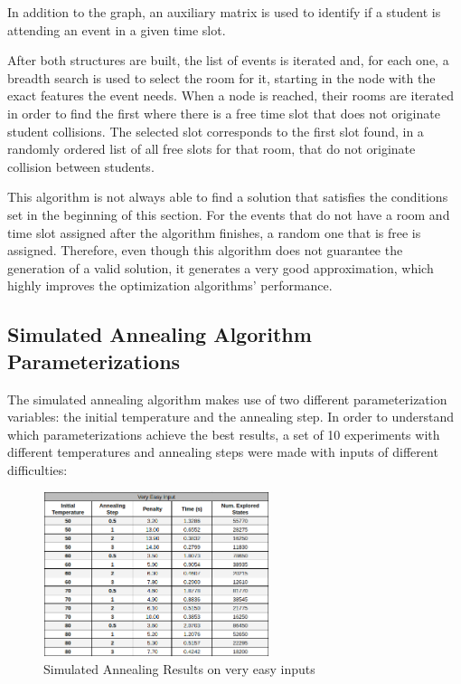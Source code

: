 \documentclass[conference]{IEEEtran}
\begin{document}
In addition to the graph, an auxiliary matrix is used to identify if a student is attending an event in a given time slot.

After both structures are built, the list of events is iterated and, for each one, a breadth search is used to select the room for it, starting in the node with the exact features the event needs. When a node is reached, their rooms are iterated in order to find the first where there is a free time slot that does not originate student collisions. The selected slot corresponds to the first slot found, in a randomly ordered list of all free slots for that room, that do not originate collision between students.

This algorithm is not always able to find a solution that satisfies the conditions set in the beginning of this section. For the events that do not have a room and time slot assigned after the algorithm finishes, a random one that is free is assigned. Therefore, even though this algorithm does not guarantee the generation of a valid solution, it generates a very good approximation, which highly improves the optimization algorithms' performance.

\subsection{Simulated Annealing Algorithm Parameterizations}

The simulated annealing algorithm makes use of two different parameterization variables: the initial temperature and the annealing step. In order to understand which parameterizations achieve the best results, a set of 10 experiments with different temperatures and annealing steps were made with inputs of different difficulties:

\begin{figure}[H]
    \centerline{\includegraphics[width=250px]{annealing_very_easy.png}}
    \caption{Simulated Annealing Results on very easy inputs}
\end{figure}
\end{document}
